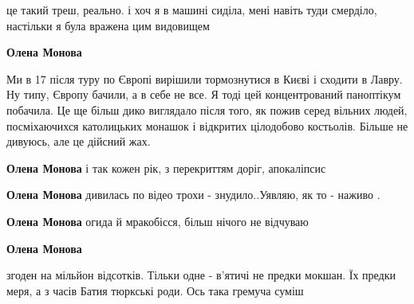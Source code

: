 \begin{itemize}
\begin{itemize}
це такий треш, реально. і хоч я в машині сиділа, мені навіть туди смерділо, настільки я була вражена цим видовищем

 
\textbf{Олена Монова} 

Ми в 17 після туру по Європі вирішили тормознутися в Києві і сходити в Лавру.
Ну типу, Європу бачили, а в себе не все. Я тоді цей концентрований паноптікум
побачила. Це ще більш дико виглядало після того, як пожив серед вільних людей,
посміхаючихся католицьких монашок і відкритих цілодобово костьолів. Більше не
дивуюсь, але це дійсний жах.


 
\textbf{Олена Монова} і так кожен рік, з перекриттям доріг, апокаліпсис

 
\textbf{Олена Монова} дивилась по відео трохи - знудило..Уявляю, як то - наживо .

 
\textbf{Олена Монова} огида й мракобісся, більш нічого не відчуваю

 
\textbf{Олена Монова} 

згоден на мільйон відсотків. Тільки одне - в'ятичі не
предки мокшан. Їх предки меря, а з часів Батия тюркські роди. Ось така гремуча
суміш


\end{itemize}
\end{itemize}

